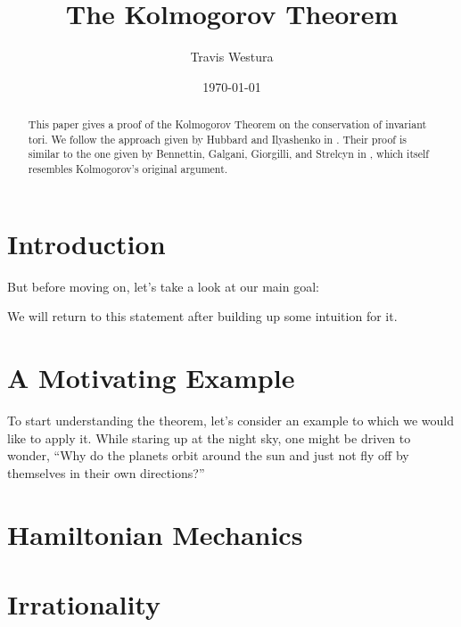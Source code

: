 \documentclass[twoside,letterpaper,10pt]{article}
\title{The Kolmogorov Theorem}
\author{Travis Westura}
\date{\today}
\begin{document}
\maketitle

\begin{abstract}
  This paper gives a proof of the Kolmogorov Theorem on the conservation of
  invariant tori.
  We follow the approach given by Hubbard and Ilyashenko in .
  Their proof is similar to the one given by Bennettin, Galgani, Giorgilli, and
  Strelcyn in , which itself resembles Kolmogorov's original argument.
\end{abstract}


\section{Introduction}
\label{sec:introduction}


But before moving on, let's take a look at our main goal:
\begin{thm}
  \label{thm:KAM}
  \KAM{}
\end{thm}
We will return to this statement after building up some intuition for it.

\section{A Motivating Example}
\label{sec:motivating-example}

To start understanding the theorem, let's consider an example to which we would
like to apply it.
While staring up at the night sky, one might be driven to wonder, ``Why do the
planets orbit around the sun and just not fly off by themselves in their own
directions?''


\section{Hamiltonian Mechanics}
\label{sec:hamilt-mech}



\section{Irrationality}
\label{sec:irrationality}
\end{document}
